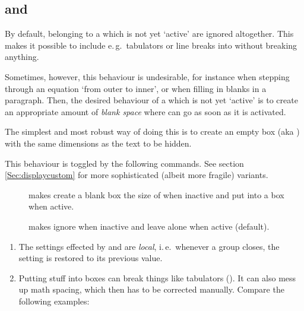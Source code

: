     \newslide

  \subsection{ and }\label{Sec:boxedsteps}%
  By default,  belonging to a  which is not yet `active' are ignored altogether. This
  makes it possible to include e.\,g.\ tabulators \code{\&} or line breaks into  without breaking
  anything.
  
  Sometimes, however, this behaviour is undesirable, for instance when stepping through an equation `from outer to
  inner', or when filling in blanks in a paragraph. Then, the desired behaviour of a  which is not yet
  `active' is to create an appropriate amount of \emph{blank space} where  can go as soon as it is
  activated.

  \newslide
  
  The simplest and most robust way of doing this is to create an empty box (aka ) with the same
  dimensions as the text to be hidden.

  This behaviour is toggled by the following commands. See section \ref{Sec:displaycustom} for more sophisticated
  (albeit more fragile) variants.
  \begin{description}
  \item[] makes  create a blank box the size of  when
    inactive and put  into a box when active.
  \item[] makes  ignore  when inactive and leave
     alone when active (default).
  \end{description}

  \newslide

  \begin{enumerate}
  \item The settings effected by  and  are \emph{local}, i.\,e.\ whenever
    a group closes, the setting is restored to its previous value.

  \item Putting stuff into boxes can break things like tabulators (\code{\&}). It can also mess up math spacing, which
    then has to be corrected manually. Compare the following examples:

  \end{enumerate}

